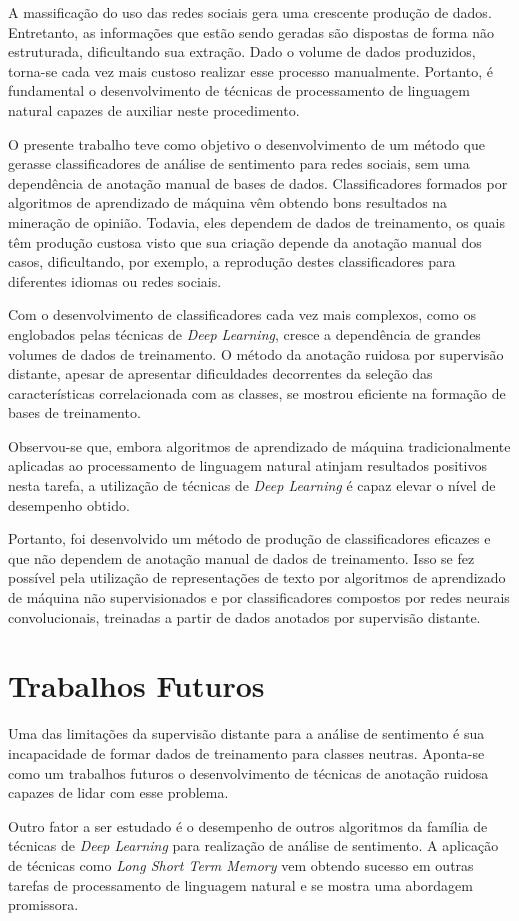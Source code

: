 A massificação do uso das redes sociais gera uma crescente produção de dados.
Entretanto, as informações que estão sendo geradas são dispostas de forma não estruturada, dificultando sua extração.
Dado o volume de dados produzidos, torna-se cada vez mais custoso realizar esse processo manualmente.
Portanto, é fundamental o desenvolvimento de técnicas de processamento de linguagem natural capazes de auxiliar neste
procedimento.

O presente trabalho teve como objetivo o desenvolvimento de um método que gerasse classificadores de análise de sentimento
para redes sociais, sem uma dependência de anotação manual de bases de dados.
Classificadores formados por algoritmos de aprendizado de máquina vêm obtendo bons resultados na mineração de opinião.
Todavia, eles dependem de dados de treinamento, os quais têm produção custosa visto que sua criação depende da anotação
manual dos casos, dificultando, por exemplo, a reprodução destes classificadores para diferentes idiomas ou redes
sociais.

Com o desenvolvimento de classificadores cada vez mais complexos, como os englobados pelas técnicas de
\textit{Deep Learning}, cresce a dependência de grandes volumes de dados de treinamento.
O método da anotação ruidosa por supervisão distante, apesar de apresentar dificuldades decorrentes da seleção das
características correlacionada com as classes, se mostrou eficiente na formação de bases de treinamento.

Observou-se que, embora algoritmos de aprendizado de máquina tradicionalmente aplicadas ao processamento de linguagem
natural atinjam resultados positivos nesta tarefa, a utilização de técnicas de \textit{Deep Learning} é capaz elevar o
nível de desempenho obtido.

Portanto, foi desenvolvido um método de produção de classificadores eficazes e que não dependem de anotação manual de
dados de treinamento.
Isso se fez possível pela utilização de representações de texto por algoritmos de aprendizado de máquina não
supervisionados e por classificadores compostos por redes neurais convolucionais, treinadas a partir de dados anotados
por supervisão distante.

\section{Trabalhos Futuros}

Uma das limitações da supervisão distante para a análise de sentimento é sua incapacidade de formar dados de treinamento
para classes neutras.
Aponta-se como um trabalhos futuros o desenvolvimento de técnicas de anotação ruidosa capazes de lidar com esse problema.

Outro fator a ser estudado é o desempenho de outros algoritmos da família de técnicas de \textit{Deep Learning} para
realização de análise de sentimento.
A aplicação de técnicas como \textit{Long Short Term Memory} vem obtendo sucesso em outras tarefas de processamento de
linguagem natural e se mostra uma abordagem promissora.
